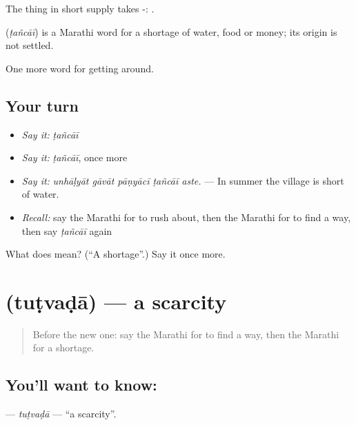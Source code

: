 The thing in short supply takes -:  .

\begin{cousinweb}
\textbf{} (\emph{ṭañcāī}) is a Marathi word for a shortage of water, food or money; its origin is not settled.
\end{cousinweb}

\begin{grammarlens}[title={What you've built}]
One more word for getting around.
\end{grammarlens}

\subsection*{Your turn}
\begin{itemize}
\raggedright
  \item \emph{Say it:} \emph{ṭañcāī}
  \item \emph{Say it:} \emph{ṭañcāī}, once more
  \item \emph{Say it:} \emph{unhāḷyāt gāvāt pāṇyācī ṭañcāī aste.} — In summer the village is short of water.
  \item \emph{Recall:} say the Marathi for to rush about, then the Marathi for to find a way, then say \emph{ṭañcāī} again
\end{itemize}

\begin{tcolorbox}[breakable,colback=teal!4,colframe=teal!35!black,title={Before you move on}]
What does  mean? (\textquotedblleft{}A shortage\textquotedblright{}.) Say it once more.
\end{tcolorbox}
\section[\texorpdfstring{\mr{तुटवडा} (tuṭvaḍā)}{तुटवडा (tuṭvaḍā)}]{ (tuṭvaḍā) — a scarcity}

\label{lesson:MR-C435-tutvada}



\begin{quote}
Before the new one: say the Marathi for to find a way, then the Marathi for a shortage.
\end{quote}

\subsection*{You'll want to know: }
\textbf{} — \emph{tuṭvaḍā} — \textquotedblleft{}a scarcity\textquotedblright{}.

